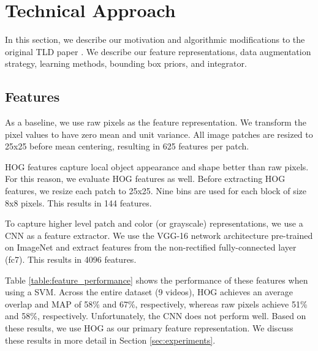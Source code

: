 \documentclass[10pt,twocolumn,letterpaper]{article}
\begin{document}
\section{Technical Approach}

In this section, we describe our motivation and algorithmic modifications to the original TLD paper \cite{kalal2012tracking}. We describe our feature representations, data augmentation strategy, learning methods, bounding box priors, and integrator.

\subsection{Features}

As a baseline, we use raw pixels as the feature representation. We transform the pixel values to have zero mean and unit variance. All image patches are resized to 25x25 before mean centering, resulting in 625 features per patch.

HOG features capture local object appearance and shape better than raw pixels. For this reason, we evaluate HOG features as well. Before extracting HOG features, we resize each patch to 25x25. Nine bins are used for each block of size 8x8 pixels. This results in 144 features.

To capture higher level patch and color (or grayscale) representations, we use a CNN as a feature extractor. We use the VGG-16 network architecture \cite{simonyan2014very} pre-trained on ImageNet \cite{ILSVRC15} and extract features from the non-rectified fully-connected layer (fc7). This results in 4096 features.

Table \ref{table:feature_performance} shows the performance of these features when using a SVM. Across the entire dataset (9 videos), HOG achieves an average overlap and MAP of 58\% and 67\%, respectively, whereas raw pixels achieve 51\% and 58\%, respectively. Unfortunately, the CNN does not perform well. Based on these results, we use HOG as our primary feature representation. We discuss these results in more detail in Section \ref{sec:experiments}.
\end{document}
